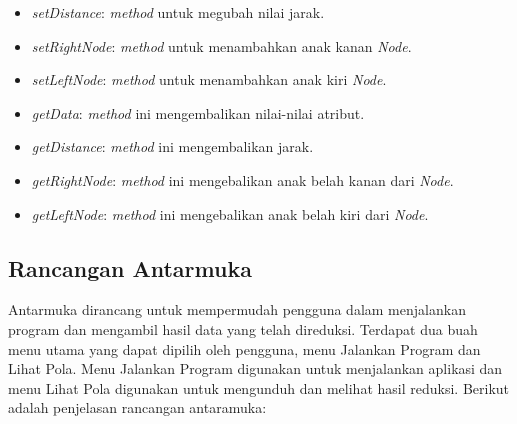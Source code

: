 \begin{itemize}
\begin{itemize}
\item \textit{setDistance}: \textit{method} untuk megubah nilai jarak.

\item \textit{setRightNode}: \textit{method} untuk menambahkan anak kanan \textit{Node}.

\item \textit{setLeftNode}: \textit{method} untuk menambahkan anak kiri \textit{Node}.

\item \textit{getData}: \textit{method} ini mengembalikan nilai-nilai atribut.

\item \textit{getDistance}: \textit{method} ini mengembalikan jarak.

\item \textit{getRightNode}: \textit{method} ini mengebalikan anak belah kanan dari \textit{Node}.

\item \textit{getLeftNode}: \textit{method} ini mengebalikan anak belah kiri dari \textit{Node}.

\end{itemize}


\end{itemize}


\subsection{Rancangan Antarmuka}

Antarmuka dirancang untuk mempermudah pengguna dalam menjalankan program dan mengambil hasil data yang telah direduksi. Terdapat dua buah menu utama yang dapat dipilih oleh pengguna, menu Jalankan Program dan Lihat Pola. Menu Jalankan Program digunakan untuk menjalankan aplikasi dan menu Lihat Pola digunakan untuk mengunduh dan melihat hasil reduksi. Berikut adalah penjelasan rancangan antaramuka:

